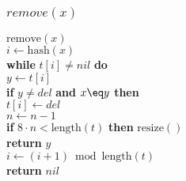 \documentclass{beamer}
\begin{document}
\begin{frame}
\frametitle{$remove(x)$}

\begin{oframed}
\begin{flushleft}
\hspace*{1em} \ensuremath{\mathrm{remove}(x)}\\
\hspace*{1em} \hspace*{1em} \ensuremath{i \gets  \ensuremath{\mathrm{hash}(x)}}\\
\hspace*{1em} \hspace*{1em} {\color{black} \textbf{while}} \ensuremath{t[i] \ne nil} {\color{black} \textbf{do}} \\
\hspace*{1em} \hspace*{1em} \hspace*{1em} \ensuremath{y \gets  \ensuremath{t[i]}}\\
\hspace*{1em} \hspace*{1em} \hspace*{1em} {\color{black} \textbf{if}} \ensuremath{y \ne \mathit{del}} {\color{black} \textbf{and}} \ensuremath{x \eq y} {\color{black} \textbf{then}} \\
\hspace*{1em} \hspace*{1em} \hspace*{1em} \hspace*{1em} \ensuremath{t[i] \gets  \ensuremath{\mathit{del}}}\\
\hspace*{1em} \hspace*{1em} \hspace*{1em} \hspace*{1em} \ensuremath{n \gets  \ensuremath{n - 1}}\\
\hspace*{1em} \hspace*{1em} \hspace*{1em} \hspace*{1em} {\color{black} \textbf{if}} \ensuremath{8\cdot n < \mathrm{length}(t)} {\color{black} \textbf{then}}  \ensuremath{\mathrm{resize}()}\\
\hspace*{1em} \hspace*{1em} \hspace*{1em} \hspace*{1em} {\color{black} \textbf{return}} \ensuremath{y}\\
\hspace*{1em} \hspace*{1em} \hspace*{1em} \ensuremath{i \gets  \ensuremath{(i + 1) \bmod  \mathrm{length}(t)}}\\
\hspace*{1em} \hspace*{1em} {\color{black} \textbf{return}} \ensuremath{\ensuremath{\mathit{nil}}}\\
\end{flushleft}
\end{oframed}


\end{frame}
\end{document}

